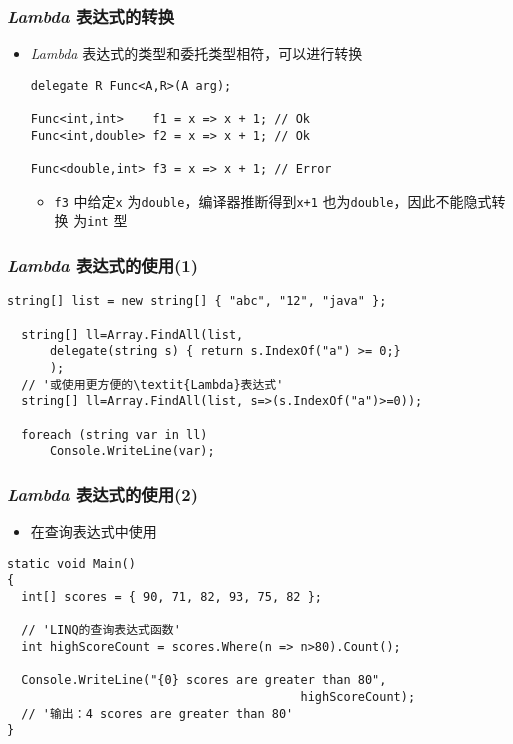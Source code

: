 \begin{frame}[fragile]
\frametitle{\textit{Lambda} 表达式的转换}
\begin{itemize}
\item \textit{Lambda} 表达式的类型和委托类型相符，可以进行转换
\begin{lstlisting}
delegate R Func<A,R>(A arg);

Func<int,int>    f1 = x => x + 1; // Ok
Func<int,double> f2 = x => x + 1; // Ok

Func<double,int> f3 = x => x + 1; // Error
\end{lstlisting}
\begin{itemize}
\item \texttt{f3} 中给定\texttt{x} 为\texttt{double}，编译器推断得到\texttt{x+1} 也为\texttt{double}，因此不能隐式转换
  为\texttt{int} 型
\end{itemize}
\end{itemize}
\end{frame}

\begin{frame}[fragile]
\frametitle{\textit{Lambda} 表达式的使用(1)}
\begin{lstlisting}[escapeinside='']
  string[] list = new string[] { "abc", "12", "java" };

  string[] ll=Array.FindAll(list,
      delegate(string s) { return s.IndexOf("a") >= 0;}
      );
  // '或使用更方便的\textit{Lambda}表达式'
  string[] ll=Array.FindAll(list, s=>(s.IndexOf("a")>=0));

  foreach (string var in ll)
      Console.WriteLine(var);
\end{lstlisting}
\end{frame}

\begin{frame}[fragile]
\frametitle{\textit{Lambda} 表达式的使用(2)}
\begin{itemize}
\item 在查询表达式中使用
\end{itemize}
\begin{lstlisting}[escapeinside='']
static void Main()
{
  int[] scores = { 90, 71, 82, 93, 75, 82 };

  // 'LINQ的查询表达式函数'
  int highScoreCount = scores.Where(n => n>80).Count();

  Console.WriteLine("{0} scores are greater than 80",
                                         highScoreCount);
  // '输出：4 scores are greater than 80'
}
\end{lstlisting}
\end{frame}

